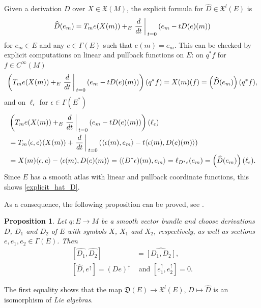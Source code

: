 \documentclass{amsart}
\theoremstyle{plain}
\newtheorem{proposition}[theorem]{Proposition}
\newcommand{\lie}[1]{\mathfrak{#1}}
\newcommand{\mx}{\mathfrak{X}}
\newcommand{\an}[1]{\arrowvert_{#1}}
\begin{document}
Given a derivation $D$ over $X\in\mx(M)$, the explicit formula for $\widehat D\in\mx^l(E)$ is 
\begin{equation}\label{explicit_hat_D}
\widehat D(e_m)=T_me(X(m))+_E\left.\frac{d}{dt}\right\an{t=0}(e_m-tD(e)(m))
\end{equation}
for $e_m\in E$ and any $e\in\Gamma(E)$ such that $e(m)=e_m$. This can be checked by explicit computations on linear and pullback functions on $E$:
on $q^*f$ for $f\in C^\infty(M)$
\begin{equation*}
\begin{split}
\left(T_me(X(m))+_E\left.\frac{d}{dt}\right\an{t=0}(e_m-tD(e)(m))\right)(q^*f)=X(m)(f)=\left(\widehat D(e_m)\right)(q^*f),
\end{split}
\end{equation*}
and on $\ell_\epsilon$ for $\epsilon \in\Gamma(E^*)$
\begin{equation*}
\begin{split}
&\left(T_me(X(m))+_E\left.\frac{d}{dt}\right\an{t=0}(e_m-tD(e)(m))\right)(\ell_\epsilon)\\
&=T_m\langle\epsilon,e\rangle(X(m))+\left.\frac{d}{dt}\right\an{t=0}(\langle \epsilon(m), e_m\rangle -t\langle \epsilon(m), D(e)(m)\rangle)\\
&=X(m)\langle\epsilon,e\rangle-\langle \epsilon(m), D(e)(m)\rangle=\langle (D^*\epsilon)(m), e_m\rangle=\ell_{D^*\epsilon}(e_m)=\left(\widehat D(e_m)\right)(\ell_\epsilon).
\end{split}
\end{equation*}
Since $E$ has a smooth atlas with linear and pullback coordinate functions, this shows \eqref{explicit_hat_D}.

As a consequence, the following proposition can be proved, see \cite{Mackenzie05}.
\begin{proposition}
Let $q\colon E\to M$ be a smooth vector bundle and choose derivations $D$, $D_1$ and $D_2$ of $E$ with symbols $X$, $X_1$ and $X_2$, respectively,
as well as sections $e, e_1, e_2\in\Gamma(E)$.
Then 
\begin{equation}\label{brackets}
\begin{split}
\left[\widehat{D_1}, \widehat{D_2}\right]&=\widehat{[D_1,D_2]},\\
\left[\widehat{D}, e^\uparrow\right]=(De)^\uparrow &\text{ and } \left[e_1^\uparrow,e_2^\uparrow\right]=0.
\end{split}
\end{equation}
\end{proposition}
The first equality shows that the map $\lie D(E)\to \mx^l(E)$, $D\mapsto\widehat{D}$ is an isomorphism of \emph{Lie algebras}.
\end{document}

